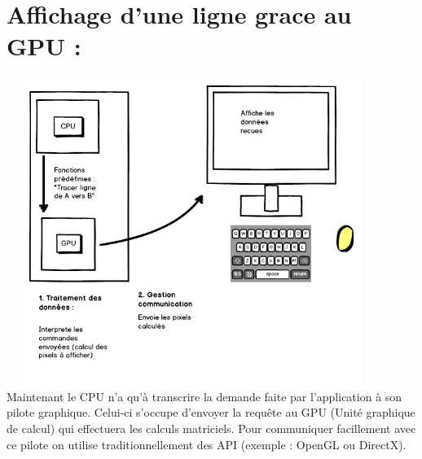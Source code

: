 \section{Affichage d'une ligne grace au GPU :}
\includegraphics[width=12cm,height=10cm]{img/gpuRaster.png} \\
Maintenant le CPU n'a qu'à transcrire la demande faite par l'application à son pilote graphique. Celui-ci s'occupe d'envoyer la requête au GPU (Unité graphique de calcul) qui effectuera les calculs matriciels. Pour communiquer facillement avec ce pilote on utilise traditionnellement des API (exemple : OpenGL ou DirectX).
